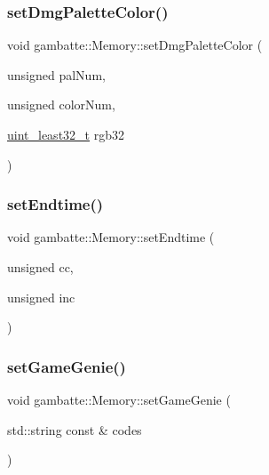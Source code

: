 \subsubsection{\texorpdfstring{set\+Dmg\+Palette\+Color()}{setDmgPaletteColor()}}
{\footnotesize\ttfamily void gambatte\+::\+Memory\+::set\+Dmg\+Palette\+Color (\begin{DoxyParamCaption}\item[{unsigned}]{pal\+Num,  }\item[{unsigned}]{color\+Num,  }\item[{\hyperlink{namespacegambatte_a0639f09fccfbbd5a8e0796318768e370}{uint\+\_\+least32\+\_\+t}}]{rgb32 }\end{DoxyParamCaption})}

\mbox{\label{classgambatte_1_1Memory_abfacd022d4954e43a1a5417cfa6df64f}} 
\subsubsection{\texorpdfstring{set\+Endtime()}{setEndtime()}}
{\footnotesize\ttfamily void gambatte\+::\+Memory\+::set\+Endtime (\begin{DoxyParamCaption}\item[{unsigned}]{cc,  }\item[{unsigned}]{inc }\end{DoxyParamCaption})}

\mbox{\label{classgambatte_1_1Memory_a842ec84c708a183b3fba3de7bddfa574}} 
\subsubsection{\texorpdfstring{set\+Game\+Genie()}{setGameGenie()}}
{\footnotesize\ttfamily void gambatte\+::\+Memory\+::set\+Game\+Genie (\begin{DoxyParamCaption}\item[{std\+::string const \&}]{codes }\end{DoxyParamCaption})\hspace{0.3cm}{\ttfamily [inline]}}

